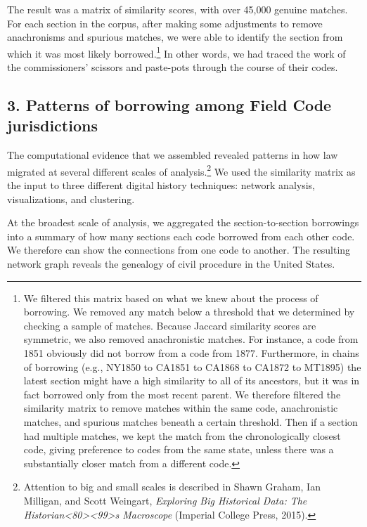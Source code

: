 \documentclass[12pt,]{article}
\let\rmarkdownfootnote\footnote%
\def\footnote{\protect\rmarkdownfootnote}
\begin{document}
The result was a matrix of similarity scores, with over 45,000 genuine
matches. For each section in the corpus, after making some adjustments
to remove anachronisms and spurious matches, we were able to identify
the section from which it was most likely borrowed.\footnote{We filtered
  this matrix based on what we knew about the process of borrowing. We
  removed any match below a threshold that we determined by checking a
  sample of matches. Because Jaccard similarity scores are symmetric, we
  also removed anachronistic matches. For instance, a code from 1851
  obviously did not borrow from a code from 1877. Furthermore, in chains
  of borrowing (e.g., NY1850 to CA1851 to CA1868 to CA1872 to MT1895)
  the latest section might have a high similarity to all of its
  ancestors, but it was in fact borrowed only from the most recent
  parent. We therefore filtered the similarity matrix to remove matches
  within the same code, anachronistic matches, and spurious matches
  beneath a certain threshold. Then if a section had multiple matches,
  we kept the match from the chronologically closest code, giving
  preference to codes from the same state, unless there was a
  substantially closer match from a different code.} In other words, we
had traced the work of the commissioners' scissors and paste-pots
through the course of their codes.

\hypertarget{patterns-of-borrowing-among-field-code-jurisdictions}{%
\subsection{3. Patterns of borrowing among Field Code
jurisdictions}\label{patterns-of-borrowing-among-field-code-jurisdictions}}

The computational evidence that we assembled revealed patterns in how
law migrated at several different scales of analysis.\footnote{Attention
  to big and small scales is described in Shawn Graham, Ian Milligan,
  and Scott Weingart, \emph{Exploring Big Historical Data: The
  Historian\textless80\textgreater\textless99\textgreater s Macroscope}
  (Imperial College Press, 2015).} We used the similarity matrix as the
input to three different digital history techniques: network analysis,
visualizations, and clustering.

At the broadest scale of analysis, we aggregated the section-to-section
borrowings into a summary of how many sections each code borrowed from
each other code. We therefore can show the connections from one code to
another. The resulting network graph reveals the genealogy of civil
procedure in the United States.
\end{document}
